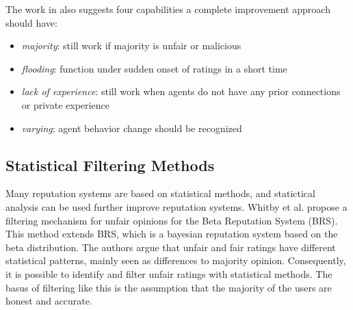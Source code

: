 \documentclass[%
    ]{\PathToTumTemplate/thesis/tum_thesis}
\begin{document}
The work in \cite{zhang_detailed_2008} also suggests four capabilities a complete improvement approach should have:
\begin{itemize}
\item \emph{majority}: still work if majority is unfair or malicious
\item \emph{flooding}: function under sudden onset of ratings in a short time
\item \emph{lack of experience}: still work when agents do not have any prior connections or private experience
\item \emph{varying}: agent behavior change should be recognized
\end{itemize}






\subsection{Statistical Filtering Methods}

Many reputation systems are based on statistical methods, and statictical analysis can be used further improve reputation systems.
Whitby et al. propose a filtering mechanism for unfair opinions for the Beta Reputation System (BRS)\cite{whitby_filtering_2014}.
This method extends BRS, which is a bayesian reputation system based on the beta distribution.
The authors argue that unfair and fair ratings have different statistical patterns, mainly seen as differences to majority opinion.
Consequently, it is possible to identify and filter unfair ratings with statistical methods.
The basus of filtering like this is the assumption that the majority of the users are honest and accurate.
\end{document}
